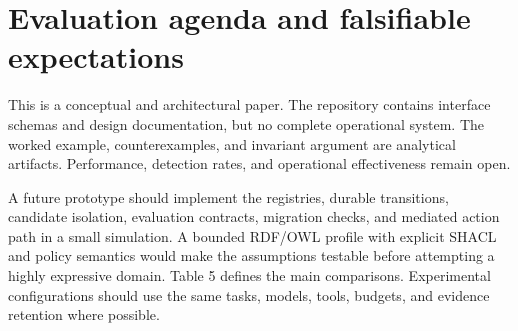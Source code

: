 \documentclass[preprint,12pt,authoryear]{elsarticle}
\begin{document}
\section{Evaluation agenda and falsifiable
expectations}\label{evaluation-agenda-and-falsifiable-expectations}

This is a conceptual and architectural paper. The repository contains
interface schemas and design documentation, but no complete operational
system. The worked example, counterexamples, and invariant argument are
analytical artifacts. Performance, detection rates, and operational
effectiveness remain open.

A future prototype should implement the registries, durable transitions,
candidate isolation, evaluation contracts, migration checks, and
mediated action path in a small simulation. A bounded RDF/OWL profile
with explicit SHACL and policy semantics would make the assumptions
testable before attempting a highly expressive domain. Table 5 defines
the main comparisons. Experimental configurations should use the same
tasks, models, tools, budgets, and evidence retention where possible.
\end{document}
